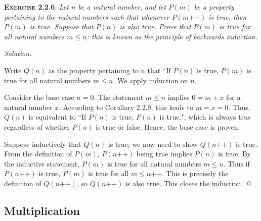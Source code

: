 \documentclass[12pt]{article}
\newcommand{\succr}[1]{#1 \textrm{++}}
\theoremstyle{remark}
\newenvironment{exer}[2]{
    \noindent \setlength{\parskip}{1em}%
    \textsc{\textbf{Exercise #1}}. \textit{#2} \par
    \noindent \textit{Solution.} %
}{\bigskip}
\begin{document}
\begin{exer}{2.2.6}{
    Let $n$ be a natural number, and let $P(m)$ be a property pertaining to the natural numbers such that whenever $P(\succr{m})$ is true, then $P(m)$ is true.
    Suppose that $P(n)$ is also true.
    Prove that $P(m)$ is true for all natural numbers $m \le n$; this is known as the \emph{principle of backwards induction}.
}
    Write $Q(n)$ as the property pertaining to $n$ that ``If $P(n)$ is true, $P(m)$ is true for all natural numbers $m \le n$. We apply induction on $n$.

    Consider the base case $n = 0$. The statement $m \le n$ implies $0 = m + x$ for a natural number $x$.
    According to Corollary 2.2.9, this leads to $m = x = 0$.
    Thus, $Q(n)$ is equivalent to ``If $P(n)$ is true, $P(n)$ is true.", which is always true regardless of whether $P(n)$ is true or false.
    Hence, the base case is proven.

    Suppose inductively that $Q(n)$ is true; we now need to show $Q(\succr{n})$ is true.
    From the definition of $P(m)$, $P(\succr{n})$ being true implies $P(n)$ is true.
    By the inductive statement, $P(m)$ is true for all natural numbers $m \le n$.
    Thus if $P(\succr{n})$ is true, $P(m)$ is true for all $m \le \succr{n}$.
    This is precisely the definition of $Q(\succr{n})$, so $Q(\succr{n})$ is also true.
    This closes the induction. \qed
\end{exer}


\subsection{Multiplication}
\end{document}
